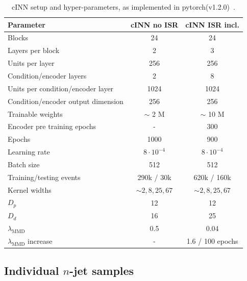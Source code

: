 \begin{table}[b!]
\centering
\begin{small} \begin{tabular}{l|c c}
\toprule
Parameter & cINN no ISR& cINN ISR incl.  \\
\midrule
Blocks & 24 & 24 \\
Layers per block & 2 & 3 \\
Units per layer & 256 & 256 \\
Condition/encoder layers & 2 & 8 \\
Units per condition/encoder layer & 1024 & 1024 \\
Condition/encoder output dimension & 256 & 256 \\
Trainable weights & $\sim$ 2 M & $\sim$ 10 M \\
Encoder pre training epochs & - & 300\\
Epochs & 1000 & 900 \\
Learning rate & $8 \cdot 10^{-4}$ & $8 \cdot 10^{-4}$\\
Batch size & 512 & 512 \\
Training/testing events & 290k / 30k & 620k / 160k\\
Kernel widths & $\sim 2, 8, 25, 67$ & $\sim 2, 8, 25, 67$\\
$D_p$ & 12 & 12 \\
$D_d$ & 16 & 25 \\
$\lambda_\text{MMD}$ & 0.5 & 0.04 \\
$\lambda_\text{MMD}$ increase & - & 1.6 / 100 epochs\\
\bottomrule
\end{tabular} \end{small}
\caption{cINN setup and hyper-parameters, as implemented in
  pytorch(v1.2.0)~\cite{pytorch}.}
\label{tab:cinn}
\end{table}

\subsection{Individual $n$-jet samples}
\label{sec:jets_indiv}

